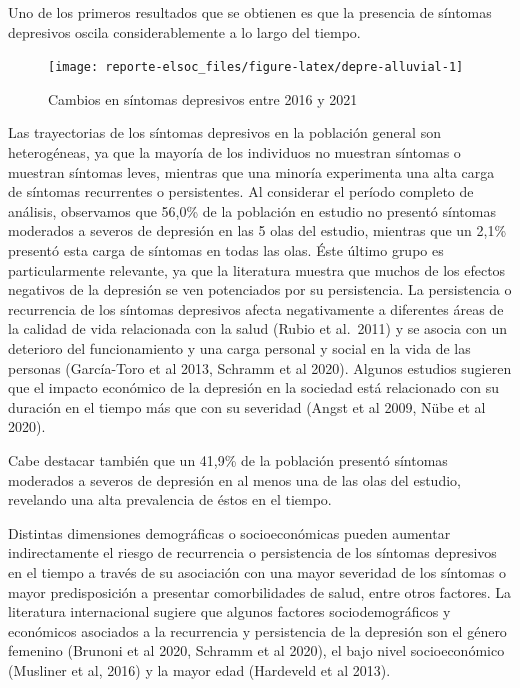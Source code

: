 \documentclass[
  12pt,
]{book}
\begin{document}
Uno de los primeros resultados que se obtienen es que la presencia de síntomas depresivos oscila considerablemente a lo largo del tiempo.

\begin{figure}

{\centering \texttt{[image: reporte-elsoc\_files/figure-latex/depre-alluvial-1]} 

}

\caption{Cambios en síntomas depresivos entre 2016 y 2021}\label{fig:depre-alluvial}
\end{figure}

Las trayectorias de los síntomas depresivos en la población general son heterogéneas, ya que la mayoría de los individuos no muestran síntomas o muestran síntomas leves, mientras que una minoría experimenta una alta carga de síntomas recurrentes o persistentes. Al considerar el período completo de análisis, observamos que 56,0\% de la población en estudio no presentó síntomas moderados a severos de depresión en las 5 olas del estudio, mientras que un 2,1\% presentó esta carga de síntomas en todas las olas. Éste último grupo es particularmente relevante, ya que la literatura muestra que muchos de los efectos negativos de la depresión se ven potenciados por su persistencia. La persistencia o recurrencia de los síntomas depresivos afecta negativamente a diferentes áreas de la calidad de vida relacionada con la salud (Rubio et al.~2011) y se asocia con un deterioro del funcionamiento y una carga personal y social en la vida de las personas (García-Toro et al 2013, Schramm et al 2020). Algunos estudios sugieren que el impacto económico de la depresión en la sociedad está relacionado con su duración en el tiempo más que con su severidad (Angst et al 2009, Nübe et al 2020).

Cabe destacar también que un 41,9\% de la población presentó síntomas moderados a severos de depresión en al menos una de las olas del estudio, revelando una alta prevalencia de éstos en el tiempo.

Distintas dimensiones demográficas o socioeconómicas pueden aumentar indirectamente el riesgo de recurrencia o persistencia de los síntomas depresivos en el tiempo a través de su asociación con una mayor severidad de los síntomas o mayor predisposición a presentar comorbilidades de salud, entre otros factores. La literatura internacional sugiere que algunos factores sociodemográficos y económicos asociados a la recurrencia y persistencia de la depresión son el género femenino (Brunoni et al 2020, Schramm et al 2020), el bajo nivel socioeconómico (Musliner et al, 2016) y la mayor edad (Hardeveld et al 2013).
\end{document}
